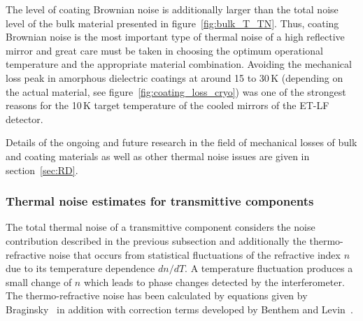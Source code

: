 
The level of coating Brownian noise is additionally larger than the total noise level of the bulk material presented in figure~\ref{fig:bulk_T_TN}. Thus, coating Brownian noise is the most important type of thermal noise of a high reflective mirror and great care must be taken in choosing the optimum operational temperature and the appropriate material combination. Avoiding the mechanical loss peak in amorphous dielectric coatings at around 15 to 30\,K (depending on the actual material, see figure~\ref{fig:coating_loss_cryo}) was one of the strongest reasons for the 10\,K target temperature of the cooled mirrors of the ET-LF detector.

Details of the ongoing and future research in the field of mechanical losses of bulk and coating materials as well as other thermal noise issues are given in section~\ref{sec:RD}.


\FloatBarrier
\subsubsection{Thermal noise estimates for transmittive components}
\label{sec:TN_trans}

The total thermal noise of a transmittive component considers the noise contribution described in the previous subsection and additionally the thermo-refractive noise that occurs from statistical fluctuations of the refractive index $n$ due to its temperature dependence $dn/dT$. A temperature fluctuation produces a small change of $n$ which leads to phase changes detected by the interferometer. The thermo-refractive noise has been calculated by equations given by Braginsky~\cite{Braginsky2004} in addition with correction terms developed by Benthem and Levin~\cite{Benthem2009}.

